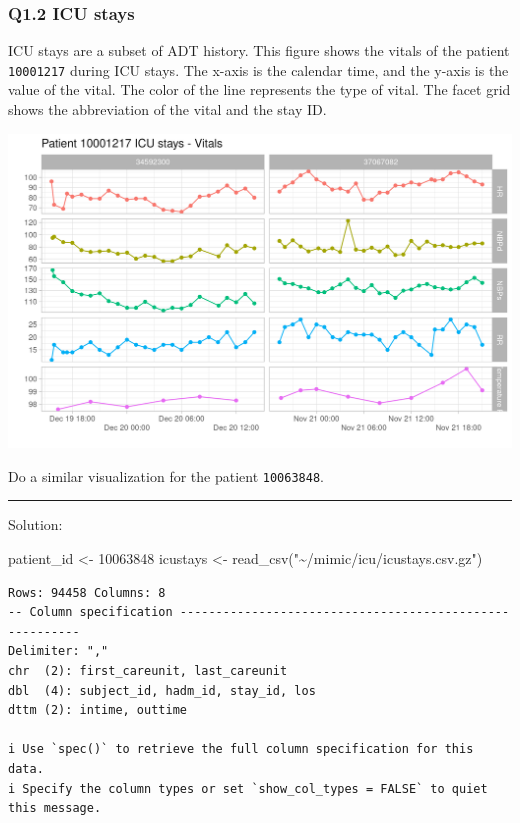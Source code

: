 \documentclass[
]{article}
\newenvironment{Shaded}{\begin{snugshade}}{\end{snugshade}}
\newcommand{\DecValTok}[1]{\textcolor[rgb]{0.00,0.00,0.81}{#1}}
\newcommand{\FunctionTok}[1]{\textcolor[rgb]{0.00,0.00,0.00}{#1}}
\newcommand{\NormalTok}[1]{\textcolor[rgb]{0.00,0.00,0.00}{#1}}
\newcommand{\OtherTok}[1]{\textcolor[rgb]{0.56,0.35,0.01}{#1}}
\newcommand{\StringTok}[1]{\textcolor[rgb]{0.31,0.60,0.02}{#1}}
\begin{document}
\hypertarget{q1.2-icu-stays}{%
\subsubsection{Q1.2 ICU stays}\label{q1.2-icu-stays}}

ICU stays are a subset of ADT history. This figure shows the vitals of
the patient \texttt{10001217} during ICU stays. The x-axis is the
calendar time, and the y-axis is the value of the vital. The color of
the line represents the type of vital. The facet grid shows the
abbreviation of the vital and the stay ID.

\includegraphics{images/10001217_icu.png}

Do a similar visualization for the patient \texttt{10063848}.

\begin{center}\rule{0.5\linewidth}{0.5pt}\end{center}

Solution:

\begin{Shaded}
\begin{Highlighting}[]
\NormalTok{patient\_id }\OtherTok{\textless{}{-}} \DecValTok{10063848}
\NormalTok{icustays }\OtherTok{\textless{}{-}} \FunctionTok{read\_csv}\NormalTok{(}\StringTok{"\textasciitilde{}/mimic/icu/icustays.csv.gz"}\NormalTok{)}
\end{Highlighting}
\end{Shaded}

\begin{verbatim}
Rows: 94458 Columns: 8
-- Column specification --------------------------------------------------------
Delimiter: ","
chr  (2): first_careunit, last_careunit
dbl  (4): subject_id, hadm_id, stay_id, los
dttm (2): intime, outtime

i Use `spec()` to retrieve the full column specification for this data.
i Specify the column types or set `show_col_types = FALSE` to quiet this message.
\end{verbatim}
\end{document}
